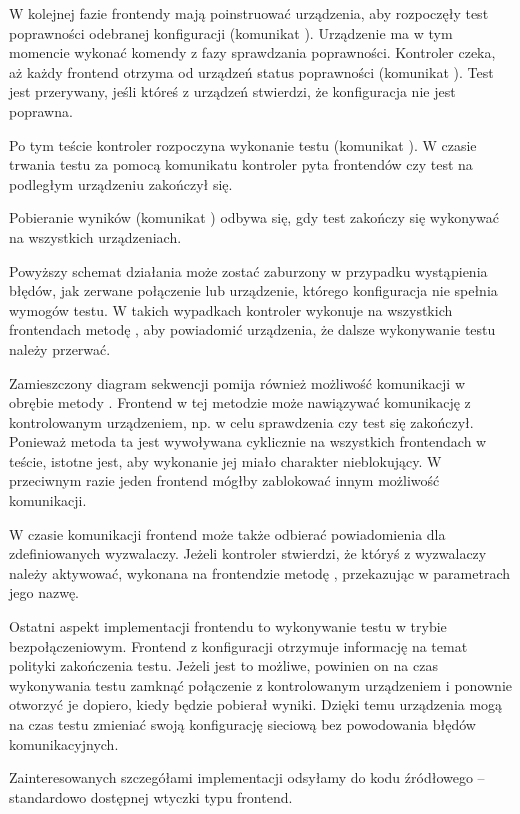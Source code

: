 \documentclass[00-praca-magisterska.tex]{subfiles}
\begin{document}
W kolejnej fazie frontendy mają poinstruować urządzenia, aby rozpoczęły test
poprawności odebranej konfiguracji (komunikat ).
Urządzenie ma w tym momencie wykonać komendy z fazy sprawdzania poprawności.
Kontroler czeka, aż każdy frontend otrzyma od urządzeń status poprawności
(komunikat ). Test jest przerywany, jeśli któreś z
urządzeń stwierdzi, że konfiguracja nie jest poprawna.

Po tym teście kontroler rozpoczyna wykonanie testu (komunikat
). W czasie trwania testu za pomocą komunikatu
 kontroler pyta frontendów czy test na podległym
urządzeniu zakończył się.

Pobieranie wyników (komunikat ) odbywa się, gdy test
zakończy się wykonywać na wszystkich urządzeniach.

Powyższy schemat działania może zostać zaburzony w przypadku wystąpienia
błędów, jak zerwane połączenie lub urządzenie, którego konfiguracja nie spełnia
wymogów testu. W takich wypadkach kontroler wykonuje na wszystkich frontendach
metodę , aby powiadomić urządzenia, że dalsze wykonywanie
testu należy przerwać.

Zamieszczony diagram sekwencji pomija również możliwość komunikacji w obrębie
metody . Frontend w tej metodzie może nawiązywać
komunikację z kontrolowanym urządzeniem, np. w celu sprawdzenia czy test się
zakończył. Ponieważ metoda ta jest wywoływana cyklicznie na wszystkich
frontendach w teście, istotne jest, aby wykonanie jej miało charakter
nieblokujący. W przeciwnym razie jeden frontend mógłby zablokować innym
możliwość komunikacji.

W czasie komunikacji frontend może także odbierać powiadomienia dla
zdefiniowanych wyzwalaczy. Jeżeli kontroler stwierdzi, że któryś z wyzwalaczy
należy aktywować, wykonana na frontendzie metodę , przekazując w
parametrach jego nazwę.

Ostatni aspekt implementacji frontendu to wykonywanie testu w trybie
bezpołączeniowym. Frontend z konfiguracji otrzymuje informację na temat
polityki zakończenia testu. Jeżeli jest to możliwe, powinien on na czas
wykonywania testu zamknąć połączenie z kontrolowanym urządzeniem i ponownie
otworzyć je dopiero, kiedy będzie pobierał wyniki. Dzięki temu urządzenia mogą
na czas testu zmieniać swoją konfigurację sieciową bez powodowania błędów
komunikacyjnych.

Zainteresowanych szczegółami implementacji odsyłamy do kodu źródłowego
 -- standardowo dostępnej wtyczki typu frontend.
\end{document}

